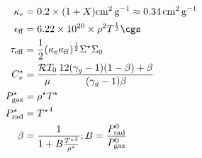\begin{subequations}
\begin{align}
        \kappa_e &= 0.2 \times (1 + X) \si{\square\centi\meter\per\gram} \approx \SI{0.34}{\square\centi\meter\per\gram} \\
        \epsilon_\mathrm{ff} &= \num{6.22e20} \times \rho^2 T^\frac{1}{2} \si{\cgs} \\
        \tau_\mathrm{eff} &= \frac{1}{2} (\kappa_e \kappa_\mathrm{ff})^\frac{1}{2} \Sigma^\star \Sigma_0 \\
        C_v^\star &= \frac{\mathcal{R} T_0}{\mu} \frac{12 (\gamma_g - 1)(1 - \beta) + \beta}{(\gamma_g - 1) \beta} \\
        P_\mathrm{gaz}^\star &= \rho^\star T^\star \\
        P_\mathrm{rad}^\star &= {T^\star}^4 \\
        \beta &= \frac{1}{1 + B \frac{{T^\star}^3}{\rho^\star}} ; B = \frac{P_\mathrm{rad}^0}{P_\mathrm{gaz}^0}
    \end{align}
\end{subequations}
